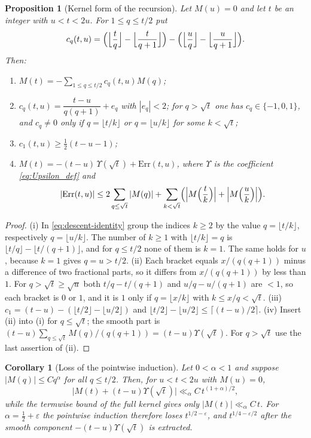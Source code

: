 \documentclass[11pt]{amsart}
\numberwithin{equation}{section}
\theoremstyle{plain}
\newtheorem{proposition}[theorem]{Proposition}
\newtheorem{corollary}[theorem]{Corollary}
\theoremstyle{definition}
\theoremstyle{remark}
\newcommand{\eps}{\varepsilon}
\begin{document}
\begin{proposition}[Kernel form of the recursion]
\label{prop:kernel}
Let $M(u)=0$ and let $t$ be an integer with $u<t<2u$. For $1\le q\le t/2$ put
\[
c_q(t,u)=\Bigl(\Bigl\lfloor\frac tq\Bigr\rfloor-\Bigl\lfloor\frac t{q+1}\Bigr\rfloor\Bigr)
-\Bigl(\Bigl\lfloor\frac uq\Bigr\rfloor-\Bigl\lfloor\frac u{q+1}\Bigr\rfloor\Bigr).
\]
Then:
\begin{enumerate}[label=\textup{(\roman*)}]
\item $M(t)=-\sum_{1\le q\le t/2}c_q(t,u)M(q)$;
\item $c_q(t,u)=\dfrac{t-u}{q(q+1)}+e_q$ with $|e_q|<2$; for $q>\sqrt t$
one has $c_q\in\{-1,0,1\}$, and $c_q\ne0$ only if $q=\lfloor t/k\rfloor$ or
$q=\lfloor u/k\rfloor$ for some $k<\sqrt t$;
\item $c_1(t,u)\ge\frac12(t-u-1)$;
\item $M(t)=-(t-u)\,\Upsilon(\sqrt t)+\mathrm{Err}(t,u)$, where $\Upsilon$ is the
coefficient \eqref{eq:Upsilon_def} and
\[
|\mathrm{Err}(t,u)|\le2\sum_{q\le\sqrt t}|M(q)|
+\sum_{k<\sqrt t}\Bigl(\Bigl|M\Bigl(\frac tk\Bigr)\Bigr|+\Bigl|M\Bigl(\frac uk\Bigr)\Bigr|\Bigr).
\]
\end{enumerate}
\end{proposition}

\begin{proof}
(i) In \eqref{eq:descent-identity} group the indices $k\ge2$ by the value
$q=\lfloor t/k\rfloor$, respectively $q=\lfloor u/k\rfloor$. The number of
$k\ge1$ with $\lfloor t/k\rfloor=q$ is
$\lfloor t/q\rfloor-\lfloor t/(q+1)\rfloor$, and for $q\le t/2$ none of them
is $k=1$. The same holds for $u$, because $k=1$ gives $q=u>t/2$. (ii) Each
bracket equals $x/(q(q+1))$ minus a difference of two fractional parts, so
it differs from $x/(q(q+1))$ by less than $1$. For $q>\sqrt t\ge\sqrt u$ both
$t/q-t/(q+1)$ and $u/q-u/(q+1)$ are $<1$, so each bracket is $0$ or $1$, and
it is $1$ only if $q=\lfloor x/k\rfloor$ with $k\le x/q<\sqrt t$.
(iii) $c_1=(t-u)-(\lfloor t/2\rfloor-\lfloor u/2\rfloor)$ and
$\lfloor t/2\rfloor-\lfloor u/2\rfloor\le\lceil(t-u)/2\rceil$.
(iv) Insert (ii) into (i) for $q\le\sqrt t$; the smooth part is
$(t-u)\sum_{q\le\sqrt t}M(q)/(q(q+1))=(t-u)\Upsilon(\sqrt t)$. For
$q>\sqrt t$ use the last assertion of (ii).
\end{proof}

\begin{corollary}[Loss of the pointwise induction]
\label{cor:induction-loss}
Let $0<\alpha<1$ and suppose $|M(q)|\le Cq^\alpha$ for all $q\le t/2$. Then,
for $u<t<2u$ with $M(u)=0$,
\begin{equation}
\label{eq:induction-loss}
\bigl|M(t)+(t-u)\Upsilon(\sqrt t)\bigr|\ll_\alpha C\,t^{(1+\alpha)/2},
\end{equation}
while the termwise bound of the full kernel gives only
$|M(t)|\ll_\alpha C\,t$. For $\alpha=\frac12+\eps$ the pointwise induction
therefore loses $t^{1/2-\eps}$, and $t^{1/4-\eps/2}$ after the smooth
component $-(t-u)\Upsilon(\sqrt t)$ is extracted.
\end{corollary}
\end{document}
